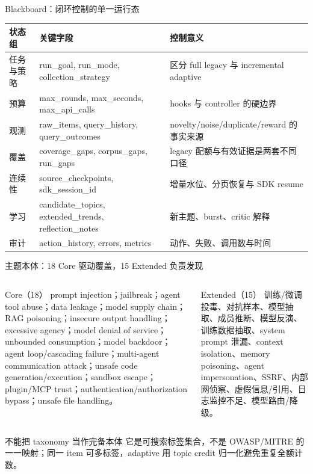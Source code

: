 \begin{frame}{Blackboard：闭环控制的单一运行态}
\scriptsize
\begin{tabularx}{\textwidth}{p{} X p{}}
\toprule
状态组 & 关键字段 & 控制意义 \\
\midrule
任务与策略 & run\_goal, run\_mode, collection\_strategy & 区分 full legacy 与 incremental adaptive \\
预算 & max\_rounds, max\_seconds, max\_api\_calls & hooks 与 controller 的硬边界 \\
观测 & raw\_items, query\_history, query\_outcomes & novelty/noise/duplicate/reward 的事实来源 \\
覆盖 & coverage\_gaps, corpus\_gaps, run\_gaps & legacy 配额与有效证据是两套不同口径 \\
连续性 & source\_checkpoints, sdk\_session\_id & 增量水位、分页恢复与 SDK resume \\
学习 & candidate\_topics, extended\_trends, reflection\_notes & 新主题、burst、critic 解释 \\
审计 & action\_history, errors, metrics & 动作、失败、调用数与时间 \\
\bottomrule
\end{tabularx}

\end{frame}

\begin{frame}{主题本体：18 Core 驱动覆盖，15 Extended 负责发现}
\begin{columns}[T,onlytextwidth]
\begin{block}{Core（18）}
\scriptsize
prompt injection；jailbreak；agent tool abuse；data leakage；model supply chain；RAG poisoning；insecure output handling；excessive agency；model denial of service；unbounded consumption；model backdoor；agent loop/cascading failure；multi-agent communication attack；unsafe code generation/execution；sandbox escape；plugin/MCP trust；authentication/authorization bypass；unsafe file handling。
\end{block}
\begin{block}{Extended（15）}
\scriptsize
训练/微调投毒、对抗样本、模型抽取、成员推断、模型反演、训练数据抽取、system prompt 泄漏、context isolation、memory poisoning、agent impersonation、SSRF、内部网侦察、虚假信息/引用、日志监控不足、模型路由/降级。
\end{block}
\end{columns}

\vspace{0.6em}
\begin{alertblock}{不能把 taxonomy 当作完备本体}
它是可搜索标签集合，不是 OWASP/MITRE 的一一映射；同一 item 可多标签，adaptive 用 topic credit 归一化避免重复全额计数。
\end{alertblock}
\end{frame}
